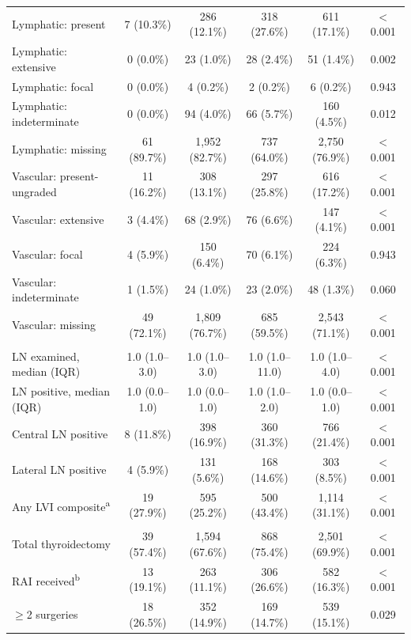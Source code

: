 \begin{landscape}
\begin{table}[htbp]
\begin{threeparttable}
\begin{tabular}{@{}lccccc@{}}
\quad Lymphatic: present & 7 (10.3\%) & 286 (12.1\%) & 318 (27.6\%) & 611 (17.1\%) & $<$0.001 \\
\quad Lymphatic: extensive & 0 (0.0\%) & 23 (1.0\%) & 28 (2.4\%) & 51 (1.4\%) & 0.002 \\
\quad Lymphatic: focal & 0 (0.0\%) & 4 (0.2\%) & 2 (0.2\%) & 6 (0.2\%) & 0.943 \\
\quad Lymphatic: indeterminate & 0 (0.0\%) & 94 (4.0\%) & 66 (5.7\%) & 160 (4.5\%) & 0.012 \\
\quad Lymphatic: missing & 61 (89.7\%) & 1{,}952 (82.7\%) & 737 (64.0\%) & 2{,}750 (76.9\%) & $<$0.001 \\
\quad Vascular: present-ungraded & 11 (16.2\%) & 308 (13.1\%) & 297 (25.8\%) & 616 (17.2\%) & $<$0.001 \\
\quad Vascular: extensive & 3 (4.4\%) & 68 (2.9\%) & 76 (6.6\%) & 147 (4.1\%) & $<$0.001 \\
\quad Vascular: focal & 4 (5.9\%) & 150 (6.4\%) & 70 (6.1\%) & 224 (6.3\%) & 0.943 \\
\quad Vascular: indeterminate & 1 (1.5\%) & 24 (1.0\%) & 23 (2.0\%) & 48 (1.3\%) & 0.060 \\
\quad Vascular: missing & 49 (72.1\%) & 1{,}809 (76.7\%) & 685 (59.5\%) & 2{,}543 (71.1\%) & $<$0.001 \\
\addlinespace
\multicolumn{6}{l}{\textit{Lymph-node burden}} \\
\quad LN examined, median (IQR) & 1.0 (1.0--3.0) & 1.0 (1.0--3.0) & 1.0 (1.0--11.0) & 1.0 (1.0--4.0) & $<$0.001 \\
\quad LN positive, median (IQR) & 1.0 (0.0--1.0) & 1.0 (0.0--1.0) & 1.0 (1.0--2.0) & 1.0 (0.0--1.0) & $<$0.001 \\
\quad Central LN positive & 8 (11.8\%) & 398 (16.9\%) & 360 (31.3\%) & 766 (21.4\%) & $<$0.001 \\
\quad Lateral LN positive & 4 (5.9\%) & 131 (5.6\%) & 168 (14.6\%) & 303 (8.5\%) & $<$0.001 \\
\quad Any LVI composite\textsuperscript{a} & 19 (27.9\%) & 595 (25.2\%) & 500 (43.4\%) & 1{,}114 (31.1\%) & $<$0.001 \\
\addlinespace
\multicolumn{6}{l}{\textit{Initial treatment}} \\
\quad Total thyroidectomy & 39 (57.4\%) & 1{,}594 (67.6\%) & 868 (75.4\%) & 2{,}501 (69.9\%) & $<$0.001 \\
\quad RAI received\textsuperscript{b} & 13 (19.1\%) & 263 (11.1\%) & 306 (26.6\%) & 582 (16.3\%) & $<$0.001 \\
\quad $\geq$2 surgeries & 18 (26.5\%) & 352 (14.9\%) & 169 (14.7\%) & 539 (15.1\%) & 0.029 \\

\end{tabular}
\end{threeparttable}
\end{table}
\end{landscape}
